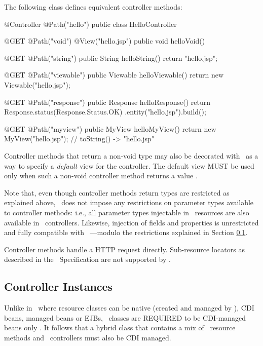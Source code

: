 The following class defines equivalent controller methods:

\begin{listing}{1}
@Controller
@Path("hello")
public class HelloController {

    @GET @Path("void")
    @View("hello.jsp")
    public void helloVoid() {
    }
    
    @GET @Path("string")
    public String helloString() {
        return "hello.jsp";
    }
    
    @GET @Path("viewable")
    public Viewable helloViewable() {
        return new Viewable("hello.jsp");
    }
    
    @GET @Path("response")
    public Response helloResponse() {
        return Response.status(Response.Status.OK)
                       .entity("hello.jsp").build();
    }    

    @GET @Path("myview")
    public MyView helloMyView() {
        return new MyView("hello.jsp");    // toString() -> "hello.jsp"
    }       
}
\end{listing}

Controller methods that return a non-void type may also be decorated with \View\ as a 
way to specify a {\em default} view for the controller. The default view MUST be 
used only when such a non-void controller method returns a  value 
.

Note that, even though controller methods return types are restricted as 
explained above, \mvc\ does not impose any restrictions on parameter
types available to controller methods: i.e., all parameter types injectable
in \jaxrs\ resources are also available in \mvc\ controllers. Likewise, injection
of fields and properties is unrestricted and fully compatible with \jaxrs\ ---modulo
the restrictions explained in Section \ref{controller_instances}.

Controller methods handle a HTTP request directly. Sub-resource locators as described
in the \jaxrs\ Specification \cite{jaxrs} are not supported by \mvc.

\subsection{Controller Instances}
\label{controller_instances}

Unlike in \jaxrs\ where resource classes can be native (created and managed by \jaxrs), 
CDI beans, managed beans or EJBs, \mvc\ classes are REQUIRED to be CDI-managed beans 
only . It follows that a hybrid class that contains a mix 
of \jaxrs\ resource methods and \mvc\ controllers must also be CDI managed. 

